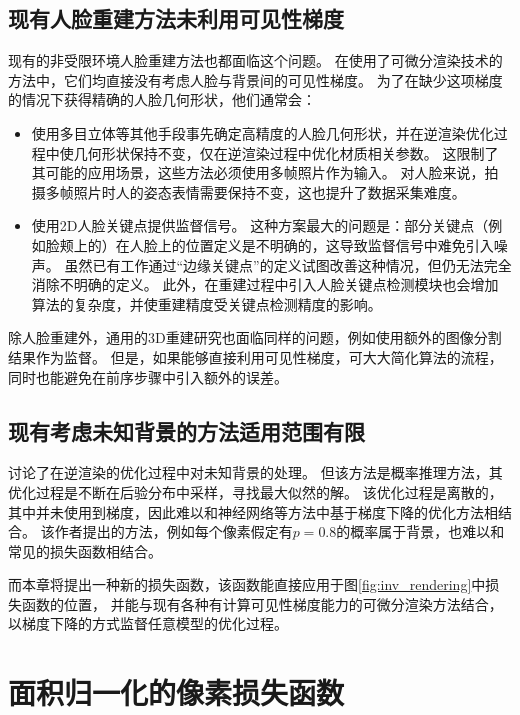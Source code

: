 \subsection{现有人脸重建方法未利用可见性梯度}

现有的非受限环境人脸重建方法也都面临这个问题。
在使用了可微分渲染技术的方法中，它们均直接没有考虑人脸与背景间的可见性梯度。
为了在缺少这项梯度的情况下获得精确的人脸几何形状，他们通常会：
\begin{itemize}
\item 使用多目立体等其他手段事先确定高精度的人脸几何形状，并在逆渲染优化过程中使几何形状保持不变，仅在逆渲染过程中优化材质相关参数\citep{RiviereGBGB20}。
这限制了其可能的应用场景，这些方法必须使用多帧照片作为输入。
对人脸来说，拍摄多帧照片时人的姿态表情需要保持不变，这也提升了数据采集难度。
\item 使用2D人脸关键点提供监督信号\citep{deep3d}。
这种方案最大的问题是：部分关键点（例如脸颊上的）在人脸上的位置定义是不明确的，这导致监督信号中难免引入噪声。
虽然已有工作\citep{qu122015adaptive}通过“边缘关键点”的定义试图改善这种情况，但仍无法完全消除不明确的定义。
此外，在重建过程中引入人脸关键点检测模块也会增加算法的复杂度，并使重建精度受关键点检测精度的影响。
\end{itemize}
除人脸重建外，通用的3D重建研究也面临同样的问题，例如\citet{nvdiffrec}使用额外的图像分割结果作为监督。
但是，如果能够直接利用可见性梯度，可大大简化算法的流程，同时也能避免在前序步骤中引入额外的误差。

\subsection{现有考虑未知背景的方法适用范围有限}

\citet{SchonbornEFV15}讨论了在逆渲染的优化过程中对未知背景的处理。
但该方法是概率推理方法，其优化过程是不断在后验分布中采样，寻找最大似然的解。
该优化过程是离散的，其中并未使用到梯度，因此难以和神经网络等方法中基于梯度下降的优化方法相结合。
该作者提出的方法，例如每个像素假定有$p=0.8$的概率属于背景，也难以和常见的损失函数相结合。

而本章将提出一种新的损失函数，该函数能直接应用于图\ref{fig:inv_rendering}中损失函数的位置，
并能与现有各种有计算可见性梯度能力的可微分渲染方法结合，以梯度下降的方式监督任意模型的优化过程。

\section{面积归一化的像素损失函数}

